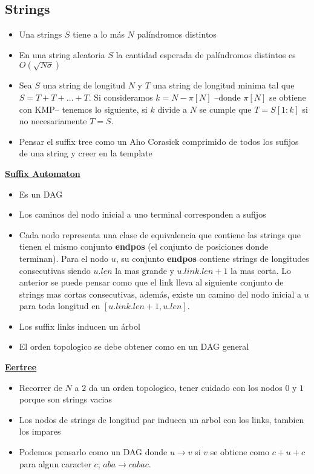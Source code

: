 \subsection{Strings}

\begin{itemize}
    \item Una strings $S$ tiene a lo más $N$ palíndromos distintos 
    \item En una string aleatoria $S$ la cantidad esperada de palíndromos distintos es $O(\sqrt{N \sigma})$
    \item Sea $S$ una string de longitud $N$ y $T$ una string de longitud minima tal que $S = T + T + \dots + T$. Si consideramos $k = N - \pi[N]$ --donde $\pi[N]$ se obtiene con KMP-- tenemos lo siguiente, si $k$ divide a $N$ se cumple que $T = S[1: k]$ si no necesariamente $T = S$.
    \item Pensar el suffix tree como un Aho Corasick comprimido de todos los sufijos de una string y creer en la template
\end{itemize}

\ul{\textbf{Suffix Automaton}}

\begin{itemize}
    \item  Es un DAG
    \item Los caminos del nodo inicial a uno terminal corresponden a sufijos
    \item Cada nodo representa una clase de equivalencia que contiene las strings que tienen el mismo conjunto \textbf{endpos} (el conjunto de posiciones donde terminan). Para el nodo $u$, su conjunto \textbf{endpos} contiene strings de longitudes consecutivas siendo $u.len$ la mas grande y $u.link.len + 1$ la mas corta. Lo anterior se puede pensar como que el link lleva al siguiente conjunto de strings mas cortas consecutivas, además, existe un camino del nodo inicial a $u$ para toda longitud en $[u.link.len + 1, u.len]$. 
    \item Los suffix links inducen un árbol 
    \item El orden topologico se debe obtener como en un DAG general
\end{itemize}

\ul{\textbf{Eertree}}

\begin{itemize}
    \item Recorrer de $N$ a $2$ da un orden topologico, tener cuidado con los nodos $0$ y $1$ porque son strings vacias
    \item Los nodos de strings de longitud par inducen un arbol con los links, tambien los impares
    \item Podemos pensarlo como un DAG donde $u \to v$ si $v$ se obtiene como $c + u + c$ para algun caracter $c$; $aba \to cabac$. 
\end{itemize}
